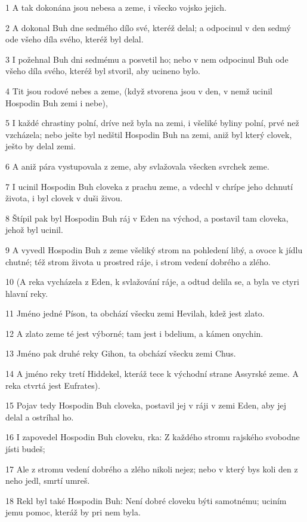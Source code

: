\par 1 A tak dokonána jsou nebesa a zeme, i všecko vojsko jejich.
\par 2 A dokonal Buh dne sedmého dílo své, kteréž delal; a odpocinul v den sedmý ode všeho díla svého, kteréž byl delal.
\par 3 I požehnal Buh dni sedmému a posvetil ho; nebo v nem odpocinul Buh ode všeho díla svého, kteréž byl stvoril, aby ucineno bylo.
\par 4 Tit jsou rodové nebes a zeme, (když stvorena jsou v den, v nemž ucinil Hospodin Buh zemi i nebe),
\par 5 I každé chrastiny polní, dríve než byla na zemi, i všeliké byliny polní, prvé než vzcházela; nebo ješte byl nedštil Hospodin Buh na zemi, aniž byl který clovek, ješto by delal zemi.
\par 6 A aniž pára vystupovala z zeme, aby svlažovala všecken svrchek zeme.
\par 7 I ucinil Hospodin Buh cloveka z prachu zeme, a vdechl v chrípe jeho dchnutí života, i byl clovek v duši živou.
\par 8 Štípil pak byl Hospodin Buh ráj v Eden na východ, a postavil tam cloveka, jehož byl ucinil.
\par 9 A vyvedl Hospodin Buh z zeme všeliký strom na pohledení libý, a ovoce k jídlu chutné; též strom života u prostred ráje, i strom vedení dobrého a zlého.
\par 10 (A reka vycházela z Eden, k svlažování ráje, a odtud delila se, a byla ve ctyri hlavní reky.
\par 11 Jméno jedné Píson, ta obchází všecku zemi Hevilah, kdež jest zlato.
\par 12 A zlato zeme té jest výborné; tam jest i bdelium, a kámen onychin.
\par 13 Jméno pak druhé reky Gihon, ta obchází všecku zemi Chus.
\par 14 A jméno reky tretí Hiddekel, kteráž tece k východní strane Assyrské zeme. A reka ctvrtá jest Eufrates).
\par 15 Pojav tedy Hospodin Buh cloveka, postavil jej v ráji v zemi Eden, aby jej delal a ostríhal ho.
\par 16 I zapovedel Hospodin Buh cloveku, rka: Z každého stromu rajského svobodne jísti budeš;
\par 17 Ale z stromu vedení dobrého a zlého nikoli nejez; nebo v který bys koli den z neho jedl, smrtí umreš.
\par 18 Rekl byl také Hospodin Buh: Není dobré cloveku býti samotnému; uciním jemu pomoc, kteráž by pri nem byla.
